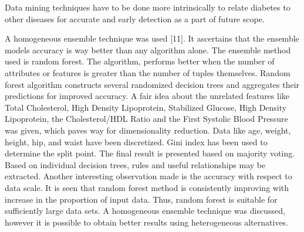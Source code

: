 Data mining techniques have to be done more intrinsically to relate diabetes to other diseases for accurate and early detection as a part of future scope. \par \noinent
A homogeneous ensemble technique was used [11]. It ascertains that the ensemble models accuracy is way better than any algorithm alone. The ensemble method used is random forest. The algorithm, performs better when the number of attributes or features is greater than the number of tuples themselves. Random forest algorithm constructs several randomized decision trees and aggregates their predictions for improved accuracy. A fair idea about the unrelated features like Total Cholesterol, High Density Lipoprotein, Stabilized Glucose, High Density Lipoprotein, the Cholesterol/HDL Ratio and the First Systolic Blood Pressure was given, which paves way for dimensionality reduction. Data like age, weight, height, hip, and waist have been discretized. Gini index has been used to determine the split point. The ﬁnal result is presented based on majority voting. Based on individual decision trees, rules and useful relationships may be extracted. Another interesting observation made is the accuracy with respect to data scale. It is seen that random forest method is consistently improving with increase in the proportion of input data. Thus, random forest is suitable for sufficiently large data sets. A homogeneous ensemble technique was discussed, however it is possible to obtain better results using heterogeneous alternatives.

